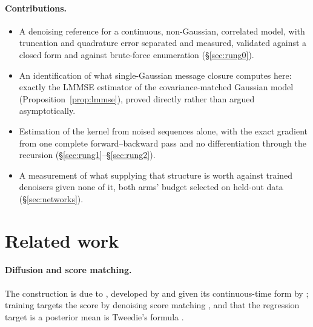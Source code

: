 \documentclass{article}
\theoremstyle{definition}
\theoremstyle{plain}
\begin{document}
\paragraph{Contributions.}
\begin{itemize}\itemsep2pt
\item A denoising reference for a continuous, non-Gaussian, correlated model, with truncation and
      quadrature error separated and measured, validated against a closed form and against
      brute-force enumeration (\S\ref{sec:rung0}).
\item An identification of what single-Gaussian message closure computes here: exactly the LMMSE
      estimator of the covariance-matched Gaussian model (Proposition~\ref{prop:lmmse}), proved
      directly rather than argued asymptotically.
\item Estimation of the kernel from noised sequences alone, with the exact gradient from one
      complete forward--backward pass and no differentiation through the recursion
      (\S\ref{sec:rung1}--\S\ref{sec:rung2}).
\item A measurement of what supplying that structure is worth against trained denoisers given none
      of it, both arms' budget selected on held-out data (\S\ref{sec:networks}).
\end{itemize}

\section{Related work}
\label{sec:related}

\paragraph{Diffusion and score matching.} The construction is due to \citet{sohl2015deep}, developed
by \citet{ho2020denoising} and given its continuous-time form by \citet{song2021scorebased}; training targets the
score by denoising score matching \citep{hyvarinen2005estimation,vincent2011connection}, and that the regression
target is a posterior mean is Tweedie's formula \citep{robbins1956empirical,miyasawa1961empirical,efron2011tweedie}.
\end{document}
